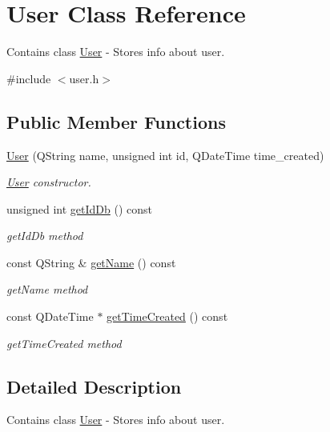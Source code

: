 \hypertarget{class_user}{}\section{User Class Reference}
\label{class_user}


Contains class \hyperlink{class_user}{User} -\/ Stores info about user.  




{\ttfamily \#include $<$user.\+h$>$}

\subsection*{Public Member Functions}
\begin{DoxyCompactItemize}
\item 
\hyperlink{class_user_acb18daf3f51821a529ef2e7302623149}{User} (Q\+String name, unsigned int id, Q\+Date\+Time time\+\_\+created)
\begin{DoxyCompactList}\small\item\em \hyperlink{class_user}{User} constructor. \end{DoxyCompactList}\item 
unsigned int \hyperlink{class_user_ac4caad7e092c8771dab3b1e301228c25}{get\+Id\+Db} () const
\begin{DoxyCompactList}\small\item\em get\+Id\+Db method \end{DoxyCompactList}\item 
const Q\+String \& \hyperlink{class_user_a17b1075380f7b40f82f0efd6cb594f3c}{get\+Name} () const
\begin{DoxyCompactList}\small\item\em get\+Name method \end{DoxyCompactList}\item 
const Q\+Date\+Time $\ast$ \hyperlink{class_user_ab195cb4d9a411de08a02bb4ddd336e1f}{get\+Time\+Created} () const
\begin{DoxyCompactList}\small\item\em get\+Time\+Created method \end{DoxyCompactList}\end{DoxyCompactItemize}


\subsection{Detailed Description}
Contains class \hyperlink{class_user}{User} -\/ Stores info about user. 

